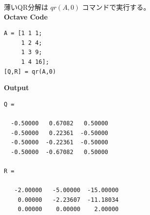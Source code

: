 \documentclass[a4paper,10pt]{jarticle}
\begin{document}
薄いQR分解は \(qr(A,0)\) コマンドで実行する。\\

\textbf{Octave Code}\\
\begin{verbatim}
A = [1 1 1;
     1 2 4; 
     1 3 9;
     1 4 16];
[Q,R] = qr(A,0)
\end{verbatim}

\textbf{Output}\\
\begin{verbatim}
Q =

  -0.50000   0.67082   0.50000
  -0.50000   0.22361  -0.50000
  -0.50000  -0.22361  -0.50000
  -0.50000  -0.67082   0.50000

R =

   -2.00000   -5.00000  -15.00000
    0.00000   -2.23607  -11.18034
    0.00000    0.00000    2.00000

\end{verbatim}
\end{document}
